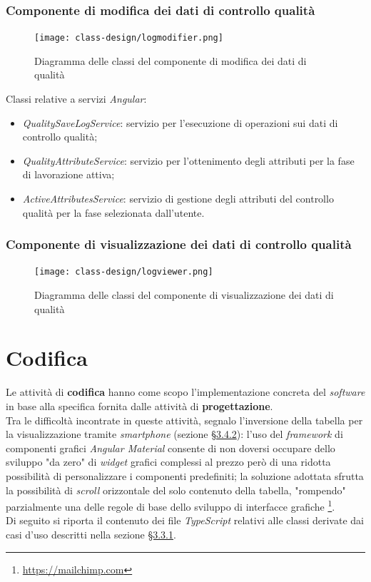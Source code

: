 \subsubsection*{Componente di modifica dei dati di controllo qualità}
\begin{figure}[H]
    \centering
    \texttt{[image: class-design/logmodifier.png]}
    \caption{Diagramma delle classi del componente di modifica dei dati di qualità}
\end{figure}
Classi relative a servizi \textit{Angular}:
\begin{itemize}
    \item \textit{QualitySaveLogService}: servizio per l'esecuzione di operazioni sui dati di controllo qualità;
    \item \textit{QualityAttributeService}: servizio per l'ottenimento degli attributi per la fase di lavorazione attiva;
    \item \textit{ActiveAttributesService}: servizio di gestione degli attributi del controllo qualità per la fase selezionata dall'utente.
\end{itemize}

\subsubsection*{Componente di visualizzazione dei dati di controllo qualità}
\begin{figure}[H]
    \centering
    \texttt{[image: class-design/logviewer.png]}
    \caption{Diagramma delle classi del componente di visualizzazione dei dati di qualità}
\end{figure}

\section{Codifica}
Le attività di \textbf{codifica} hanno come scopo l'implementazione concreta del \textit{software} in base alla specifica fornita dalle attività di \textbf{progettazione}. \\
Tra le difficoltà incontrate in queste attività, segnalo l'inversione della tabella per la visualizzazione tramite \textit{smartphone} (sezione \hyperref[subsubsec:mobile]{§3.4.2}): l'uso del \textit{framework} di componenti grafici \textit{Angular Material} consente di non doversi occupare
dello sviluppo "da zero" di \textit{widget} grafici complessi al prezzo però di una ridotta possibilità di personalizzare i componenti predefiniti; la soluzione adottata sfrutta la possibilità di \textit{scroll} orizzontale del solo contenuto della tabella,
"rompendo" parzialmente una delle regole di base dello sviluppo di interfacce grafiche \footnote{\href{https://mailchimp.com/resources/horizontal-scrolling/}{https://mailchimp.com}}. \\
Di seguito si riporta il contenuto dei file \textit{TypeScript} relativi alle classi derivate dai casi d'uso descritti nella sezione \hyperref[subsubsec:casi-d'uso]{§3.3.1}.

